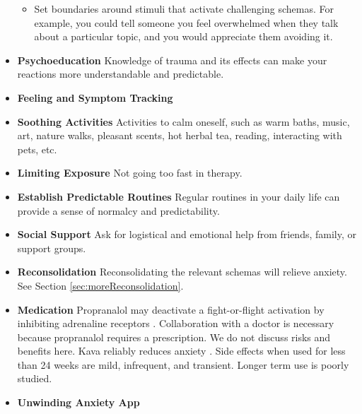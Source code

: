 \documentclass[12pt,letterpaper]{book}
\begin{document}
\begin{itemize}
\begin{itemize}
        \item Set boundaries around stimuli that activate challenging schemas. For example, you could tell someone you feel overwhelmed when they talk about a particular topic, and you would appreciate them avoiding it.
    \end{itemize}
    \item \textbf{Psychoeducation} Knowledge of trauma and its effects can make your reactions more understandable and predictable. 
    \item \textbf{Feeling and Symptom Tracking} 
    \item \textbf{Soothing Activities} Activities to calm oneself, such as warm baths, music, art, nature walks, pleasant scents, hot herbal tea, reading, interacting with pets, etc. 
    \item \textbf{Limiting Exposure} Not going too fast in therapy.  
    \item \textbf{Establish Predictable Routines} Regular routines in your daily life can provide a sense of normalcy and predictability. 
    \item \textbf{Social Support} Ask for logistical and emotional help from friends, family, or support groups. 
    \item \textbf{Reconsolidation} Reconsolidating the relevant schemas will relieve anxiety. See Section \ref{sec:moreReconsolidation}.
    \item \textbf{Medication} Propranalol may deactivate a fight-or-flight activation by inhibiting adrenaline receptors \cite{steenenPropranalol}. Collaboration with a doctor is necessary because propranalol requires a prescription. We do not discuss risks and benefits here. Kava reliably reduces anxiety \cite{Pittler03kava}. Side effects when used for less than 24 weeks are mild, infrequent, and transient. Longer term use is poorly studied.
    \item \textbf{Unwinding Anxiety App} \todo{}
\end{itemize}
\end{document}
